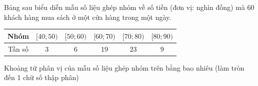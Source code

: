 \begin{ex}%
	Bảng sau biểu diễn mẫu số liệu ghép nhóm về số tiền (đơn vị: nghìn đồng) mà $60$ khách hàng mua sách ở một cửa hàng trong một ngày.
	\begin{center}
		\begin{tabular}{|c|c|c|c|c|c|}
			\hline Nhóm  &$[40 ; 50)$ & {$[50 ; 60)$} & {$[60 ; 70)$} &	{$[70 ; 80)$} &	{$[80 ; 90)$} \\
			\hline Tần số & $3$ & $6$ & $19$ & $23$ &$9$\\
			\hline
		\end{tabular}
	\end{center}
	Khoảng tứ phân vị của mẫu số liệu ghép nhóm trên bằng bao nhiêu (làm tròn đến 1 chữ số thập phân)
\end{ex}

